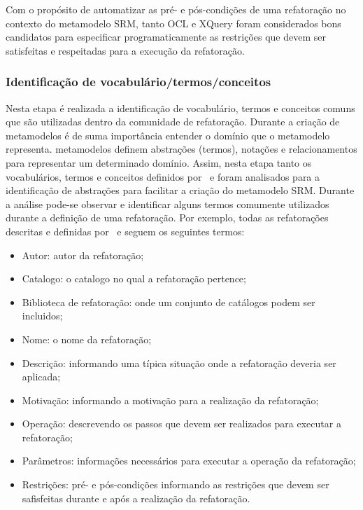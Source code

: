 Com o propósito de automatizar as pré- e pós-condições de uma refatoração no contexto do metamodelo SRM, tanto OCL e XQuery foram considerados bons candidatos para especificar programaticamente as restrições que devem ser satisfeitas e respeitadas para a execução da refatoração.




\subsubsection{Identificação de vocabulário/termos/conceitos}

Nesta etapa é realizada a identificação de vocabulário, termos e conceitos comuns que são utilizadas dentro da comunidade de refatoração. Durante a criação de metamodelos é de suma importância entender o domínio que o metamodelo representa. metamodelos definem abstrações (termos), notações e relacionamentos para representar um determinado domínio. Assim, nesta etapa tanto os vocabulários, termos e conceitos definidos por~ e  foram analisados para a identificação de abstrações para facilitar a criação do metamodelo SRM. Durante a análise pode-se observar e identificar alguns termos comumente utilizados durante a definição de uma refatoração. Por exemplo, todas as refatorações descritas e definidas por~ e  seguem os seguintes termos: 

\begin{itemize}
\item Autor: autor da refatoração;
\item Catalogo: o catalogo no qual a refatoração pertence;
\item Biblioteca de refatoração: onde um conjunto de catálogos podem ser incluidos;
\item Nome: o nome da refatoração;
\item Descrição: informando uma típica situação onde a refatoração deveria ser aplicada;
\item Motivação: informando a motivação para a realização da refatoração;
\item Operação: descrevendo os passos que devem ser realizados para executar a refatoração;
\item Parâmetros: informações necessários para executar a operação da refatoração;
\item Restrições: pré- e pós-condições informando as restrições que devem ser safisfeitas durante e após a realização da refatoração.
\end{itemize}

